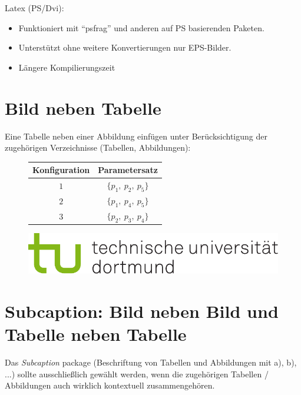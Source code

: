 Latex (PS/Dvi):
\begin{itemize}
	\item Funktioniert mit "`psfrag"' und anderen auf PS basierenden Paketen.
	\item Unterstützt ohne weitere Konvertierungen nur EPS-Bilder.
	\item Längere Kompilierungszeit
\end{itemize}


\section{Bild neben Tabelle}
Eine Tabelle neben einer Abbildung einfügen unter Berücksichtigung der zugehörigen Verzeichnisse (Tabellen, Abbildungen):
\begin{figure}[htbp]
%
	\begin{minipage}[t]{0.45\textwidth}
	\centering
		\begin{tabular}{cc}
		\toprule
		Konfiguration & Parametersatz \\
		\midrule
		$1$ & $\{p_{1}, \: p_{2}, \: p_{5}\}$ \\
		$2$ & $\{p_{1}, \: p_{4}, \: p_{5}\}$ \\
		$3$ & $\{p_{2}, \: p_{3}, \: p_{4}\}$ \\
		\bottomrule
		\end{tabular}
	\label{tab:bsp2}
	\end{minipage}
	\hfill
	\begin{minipage}[t]{0.45\textwidth}
		\centering
	  	\includegraphics[width=\textwidth]{images/logos/tud_logo_rgb}
	\end{minipage}
\end{figure}


\section{Subcaption: Bild neben Bild und Tabelle neben Tabelle}

Das \textit{Subcaption} package (Beschriftung von Tabellen und Abbildungen mit a), b), ...) sollte ausschließlich gewählt werden,
wenn die zugehörigen Tabellen / Abbildungen auch wirklich kontextuell zusammengehören.

